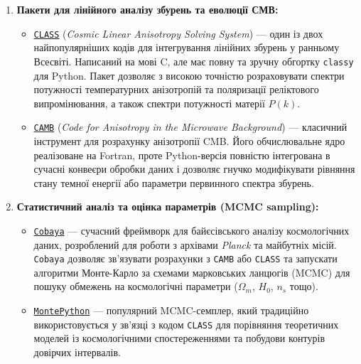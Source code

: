 \begin{enumerate}[leftmargin=*]
    \item \textbf{Пакети для лінійного аналізу збурень та еволюції СМВ:}
    \begin{itemize}
        \item \href{http://class-code.net/}{\texttt{CLASS}} (\emph{Cosmic Linear Anisotropy Solving System}) --- один із двох найпопулярніших кодів для інтегрування лінійних збурень у ранньому Всесвіті. Написаний на мові C, але має повну та зручну обгортку \texttt{classy} для Python. Пакет дозволяє з високою точністю розраховувати спектри потужності температурних анізотропій та поляризації реліктового випромінювання, а також спектри потужності матерії $P(k)$.
        \item \href{https://camb.readthedocs.io/}{\texttt{CAMB}} (\emph{Code for Anisotropy in the Microwave Background}) --- класичний інструмент для розрахунку анізотропії CMB. Його обчислювальне ядро реалізоване на Fortran, проте Python-версія повністю інтегрована в сучасні конвеєри обробки даних і дозволяє гнучко модифікувати рівняння стану темної енергії або параметри первинного спектра збурень.
    \end{itemize}

    \item \textbf{Статистичний аналіз та оцінка параметрів (MCMC sampling):}
    \begin{itemize}
        \item \href{https://cobaya.readthedocs.io/}{\texttt{Cobaya}} --- сучасний фреймворк для байєсівського аналізу космологічних даних, розроблений для роботи з архівами \emph{Planck} та майбутніх місій. \texttt{Cobaya} дозволяє зв'язувати розрахунки з \texttt{CAMB} або \texttt{CLASS} та запускати алгоритми Монте-Карло за схемами марковських ланцюгів (MCMC) для пошуку обмежень на космологічні параметри ($\Omega_m$, $H_0$, $n_s$ тощо).
        \item \href{https://github.com/brinckmann/montepython_public}{\texttt{MontePython}} --- популярний MCMC-семплер, який традиційно використовується у зв'язці з кодом \texttt{CLASS} для порівняння теоретичних моделей із космологічними спостереженнями та побудови контурів довірчих інтервалів.
    \end{itemize}


\end{enumerate}
